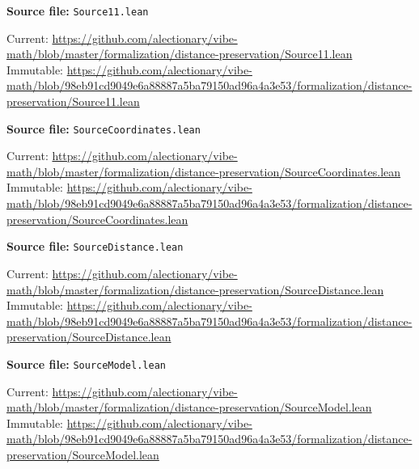 \par\smallskip\noindent\begin{minipage}{\linewidth}\small\setlength{\baselineskip}{11pt}
\textbf{Source file:} \nolinkurl{Source11.lean}\par\nopagebreak
Current: \url{https://github.com/alectionary/vibe-math/blob/master/formalization/distance-preservation/Source11.lean}\\
Immutable: \url{https://github.com/alectionary/vibe-math/blob/98eb91cd9049e6a88887a5ba79150ad96a4a3e53/formalization/distance-preservation/Source11.lean}\par\end{minipage}\par
\par\smallskip\noindent\begin{minipage}{\linewidth}\small\setlength{\baselineskip}{11pt}
\textbf{Source file:} \nolinkurl{SourceCoordinates.lean}\par\nopagebreak
Current: \url{https://github.com/alectionary/vibe-math/blob/master/formalization/distance-preservation/SourceCoordinates.lean}\\
Immutable: \url{https://github.com/alectionary/vibe-math/blob/98eb91cd9049e6a88887a5ba79150ad96a4a3e53/formalization/distance-preservation/SourceCoordinates.lean}\par\end{minipage}\par
\par\smallskip\noindent\begin{minipage}{\linewidth}\small\setlength{\baselineskip}{11pt}
\textbf{Source file:} \nolinkurl{SourceDistance.lean}\par\nopagebreak
Current: \url{https://github.com/alectionary/vibe-math/blob/master/formalization/distance-preservation/SourceDistance.lean}\\
Immutable: \url{https://github.com/alectionary/vibe-math/blob/98eb91cd9049e6a88887a5ba79150ad96a4a3e53/formalization/distance-preservation/SourceDistance.lean}\par\end{minipage}\par
\par\smallskip\noindent\begin{minipage}{\linewidth}\small\setlength{\baselineskip}{11pt}
\textbf{Source file:} \nolinkurl{SourceModel.lean}\par\nopagebreak
Current: \url{https://github.com/alectionary/vibe-math/blob/master/formalization/distance-preservation/SourceModel.lean}\\
Immutable: \url{https://github.com/alectionary/vibe-math/blob/98eb91cd9049e6a88887a5ba79150ad96a4a3e53/formalization/distance-preservation/SourceModel.lean}\par\end{minipage}\par
